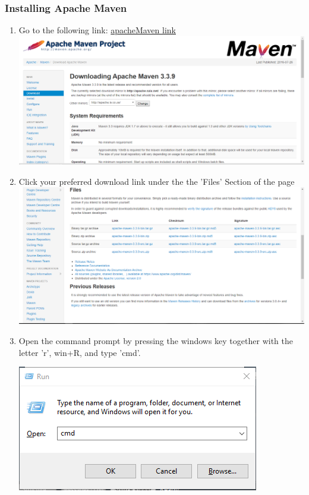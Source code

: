 \documentclass[a4paper,12pt]{article}
\begin{document}
\subsubsection{Installing Apache Maven}
\begin{enumerate}
\item Go to the following link: \href{https://maven.apache.org/download.cgi}{apacheMaven link}\\[0.2cm]
\includegraphics[width=0.9\linewidth, center]{./Installation/maven_download_1.PNG}\\[0.4cm] 
 
\item Click your preferred download link under the the 'Files' Section of the page\\[0.2cm]

\includegraphics[width=0.9\linewidth, center]{./Installation/maven_download_2.PNG}\\[0.4cm] 

\newpage
\item Open the command prompt by pressing the windows key together with the letter 'r', win+R, and type 'cmd'.

\includegraphics[width=0.9\linewidth, center]{./Installation/maven_download_3.PNG}\\[0.4cm] 
 

\end{enumerate}
\end{document}
